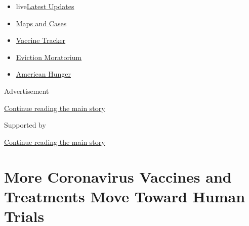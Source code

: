 \begin{itemize}
\tightlist
\item
  live\href{https://www.nytimes3xbfgragh.onion/2020/09/05/world/coronavirus-covid.html?name=styln-coronavirus-national\&region=TOP_BANNER\&block=storyline_menu_recirc\&action=click\&pgtype=Article\&impression_id=2427eaa0-efbb-11ea-b4bc-89fe1dc99e22\&variant=undefined}{Latest
  Updates}
\item
  \href{https://www.nytimes3xbfgragh.onion/interactive/2020/us/coronavirus-us-cases.html?name=styln-coronavirus-national\&region=TOP_BANNER\&block=storyline_menu_recirc\&action=click\&pgtype=Article\&impression_id=2427eaa1-efbb-11ea-b4bc-89fe1dc99e22\&variant=undefined}{Maps
  and Cases}
\item
  \href{https://www.nytimes3xbfgragh.onion/interactive/2020/science/coronavirus-vaccine-tracker.html?name=styln-coronavirus-national\&region=TOP_BANNER\&block=storyline_menu_recirc\&action=click\&pgtype=Article\&impression_id=2427eaa2-efbb-11ea-b4bc-89fe1dc99e22\&variant=undefined}{Vaccine
  Tracker}
\item
  \href{https://www.nytimes3xbfgragh.onion/2020/09/02/your-money/eviction-moratorium-covid.html?name=styln-coronavirus-national\&region=TOP_BANNER\&block=storyline_menu_recirc\&action=click\&pgtype=Article\&impression_id=2427eaa3-efbb-11ea-b4bc-89fe1dc99e22\&variant=undefined}{Eviction
  Moratorium}
\item
  \href{https://www.nytimes3xbfgragh.onion/interactive/2020/09/02/magazine/food-insecurity-hunger-us.html?name=styln-coronavirus-national\&region=TOP_BANNER\&block=storyline_menu_recirc\&action=click\&pgtype=Article\&impression_id=242811b0-efbb-11ea-b4bc-89fe1dc99e22\&variant=undefined}{American
  Hunger}
\end{itemize}

Advertisement

\protect\hyperlink{after-top}{Continue reading the main story}

Supported by

\protect\hyperlink{after-sponsor}{Continue reading the main story}

\hypertarget{more-coronavirus-vaccines-and-treatments-move-toward-human-trials}{%
\section{More Coronavirus Vaccines and Treatments Move Toward Human
Trials}\label{more-coronavirus-vaccines-and-treatments-move-toward-human-trials}}

